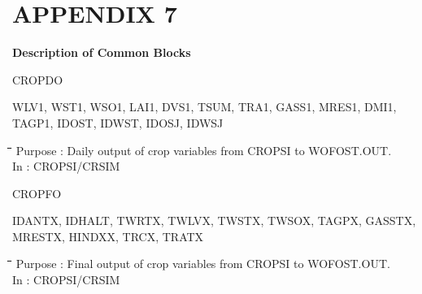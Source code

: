 \documentclass[11pt]{article}
\begin{document}
\setcounter{page}{146}\pagenumpos{\pnbr}
\section{  APPENDIX 7  }

\bigskip
{\bf {\large Description of Common Blocks}}

\bigskip
CROPDO
\testlastline

\begin{indenting}{2.54cm}
WLV1, WST1, WSO1, LAI1, DVS1, TSUM, TRA1, GASS1, MRES1, DMI1, TAGP1, IDOST,
IDWST, IDOSJ, IDWSJ
\end{indenting}
\begin{tabbing}
\hspace{1.27cm}\=\hspace{1.27cm}\=\hspace{1.27cm}\=\hspace{1.27cm}\=%
\hspace{1.27cm}\=\hspace{1.27cm}\=\hspace{1.27cm}\=\hspace{1.27cm}\=%
\hspace{1.27cm}\=\hspace{1.27cm}\=\kill
\>\> Purpose\> : Daily output of crop variables from CROPSI to WOFOST.OUT.\\
\>\> In\> : CROPSI/CRSIM
\end{tabbing}

\bigskip
CROPFO
\testlastline

\begin{indenting}{2.54cm}
IDANTX, IDHALT, TWRTX, TWLVX, TWSTX, TWSOX, TAGPX, GASSTX, MRESTX, HINDXX,
TRCX, TRATX
\end{indenting}
\begin{tabbing}
\hspace{1.27cm}\=\hspace{1.27cm}\=\hspace{1.27cm}\=\hspace{1.27cm}\=%
\hspace{1.27cm}\=\hspace{1.27cm}\=\hspace{1.27cm}\=\hspace{1.27cm}\=%
\hspace{1.27cm}\=\hspace{1.27cm}\=\kill
\>\> Purpose\> : Final output of crop variables from CROPSI to WOFOST.OUT.\\
\>\> In\> : CROPSI/CRSIM
\end{tabbing}
\end{document}
